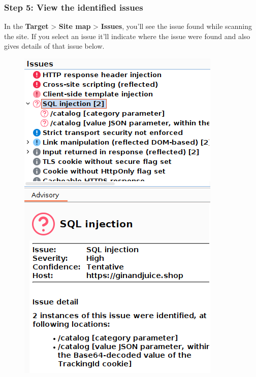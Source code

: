 \documentclass[
	a4paper, %
	12pt, %
]{CSSullivanBusinessReport}
\begin{document}
\subsubsection*{Step 5: View the identified issues}
\begin{fullwidth}
In the {\color{orange}\textbf{Target}} > {\color{orange}\textbf{Site map}} > {\color{orange}\textbf{Issues}}, you'll see the issue found while scanning the site. If you select an issue it'll indicate where the issue were found and also gives details of that issue below.
\begin{figure}[H]
    \centering
    \includegraphics[width=0.75\linewidth]{Images//using scanner/issue.png}

\end{figure}
\end{fullwidth}


\end{document}

